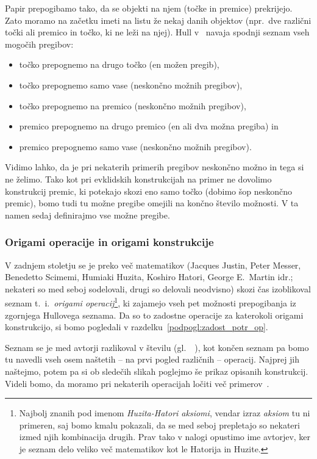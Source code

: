 Papir prepogibamo tako, da se objekti na njem (točke in premice) prekrijejo. Zato moramo na začetku imeti na listu že nekaj danih objektov (npr.\ dve različni točki ali premico in točko, ki ne leži na njej). Hull v~\cite[str.\ 24--26]{hull2020} navaja spodnji seznam vseh mogočih pregibov:
\begin{itemize}
    \item točko prepognemo na drugo točko (en možen pregib),
    \item točko prepognemo samo vase (neskončno možnih pregibov),
    \item točko prepognemo na premico (neskončno možnih pregibov),
    \item premico prepognemo na drugo premico (en ali dva možna pregiba) in
    \item premico prepognemo samo vase (neskončno možnih pregibov).
\end{itemize}
Vidimo lahko, da je pri nekaterih primerih pregibov neskončno možno in tega si ne želimo. Tako kot pri evklidskih konstrukcijah na primer ne dovolimo konstrukcij premic, ki potekajo skozi eno samo točko (dobimo šop neskončno premic), bomo tudi tu možne pregibe omejili na končno število možnosti. V ta namen sedaj definirajmo vse možne pregibe.

\subsubsection{Origami operacije in origami konstrukcije}
\label{podpodpogl:operacije}

V zadnjem stoletju se je preko več matematikov (Jacques Justin, Peter Messer, Benedetto Scimemi, Humiaki Huzita, Koshiro Hatori, George E.\ Martin idr.; nekateri so med seboj sodelovali, drugi so delovali neodvisno) skozi čas izoblikoval seznam t.\ i.\ \emph{origami operacij}\footnote{Najbolj znanih pod imenom \emph{Huzita-Hatori aksiomi}, vendar izraz \emph{aksiom} tu ni primeren, saj bomo kmalu pokazali, da se med seboj prepletajo so nekateri izmed njih kombinacija drugih. Prav tako v nalogi opustimo ime avtorjev, ker je seznam delo veliko več matematikov kot le Hatorija in Huzite.}, ki zajamejo vseh pet možnosti prepogibanja iz zgornjega Hullovega seznama. Da so to zadostne operacije za katerokoli origami konstrukcijo, si bomo pogledali v razdelku~\ref{podpogl:zadost_potr_op}.

Seznam se je med avtorji razlikoval v številu (gl.\ ~\cite[str.\ 29--30]{hull2020}), kot končen seznam pa bomo tu navedli vseh osem naštetih -- na prvi pogled različnih -- operacij. Najprej jih naštejmo, potem pa si ob sledečih slikah poglejmo še prikaz opisanih konstrukcij. Videli bomo, da moramo pri nekaterih operacijah ločiti več primerov~\cite{michael2005, zore2022}.

